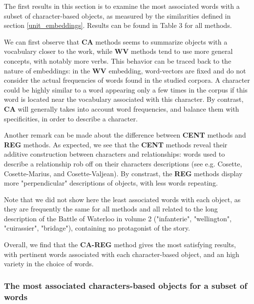 \documentclass[
twocolumn,
]{ceurart}
\begin{document}
The first results in this section is to examine the most associated words with a subset of character-based objects, as measured by the similarities defined in section \ref{unit_embeddings}. Results can be found in Table 3 for all methods.

We can first observe that \textbf{CA} methods seems to summarize objects with a vocabulary closer to the work, while \textbf{WV} methods tend to use more general concepts, with notably more verbs. This behavior can be traced back to the nature of embeddings: in the \textbf{WV} embedding, word-vectors are fixed and do not consider the actual frequencies of words found in the studied corpora. A character could be highly similar to a word appearing only a few times in the corpus if this word is located near the vocabulary associated with this character. By contrast, \textbf{CA} will generally takes into account word frequencies, and balance them with specificities, in order to describe a character.

Another remark can be made about the difference between \textbf{CENT} methods and \textbf{REG} methods. As expected, we see that the \textbf{CENT} methods reveal their additive construction between characters and relationships: words used to describe a relationship rob off on their characters descriptions (see e.g. Cosette, Cosette-Marius, and Cosette-Valjean). By constrast, the \textbf{REG} methods display more "perpendicular" descriptions of objects, with less words repeating.   

Note that we did not show here the least associated words with each object, as they are frequently the same for all methods and all related to the long description of the Battle of Waterloo in volume 2 ("infanterie", "wellington", "cuirassier", "bridage"), containing no protagonist of the story. 

Overall, we find that the \textbf{CA-REG} method gives the most satisfying results, with pertinent words associated with each character-based object, and an high variety in the choice of words. 
	
\subsubsection{The most associated characters-based objects for a subset of words}
\label{objects}

\end{document}
